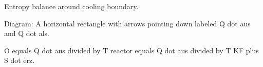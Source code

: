 Entropy balance around cooling boundary.

Diagram: A horizontal rectangle with arrows pointing down labeled Q dot aus and Q dot als.

O equals Q dot aus divided by T reactor equals Q dot aus divided by T KF plus S dot erz.